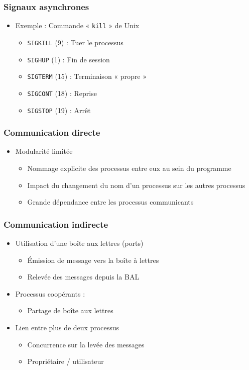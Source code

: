\begin{frame}
\frametitle{Signaux asynchrones}
\begin{itemize}
\item Exemple : Commande « \texttt{kill} » de Unix
\begin{itemize}
\item \texttt{SIGKILL} (9) : 	Tuer le processus
\item \texttt{SIGHUP} (1) : 	Fin de session
\item \texttt{SIGTERM} (15) : 	Terminaison « propre »
\item \texttt{SIGCONT} (18) : 	Reprise
\item \texttt{SIGSTOP} (19) : 	Arrêt
\end{itemize}
\end{itemize}
\end{frame}

\begin{frame}
\frametitle{Communication directe}
\begin{itemize}
\item Modularité limitée
\begin{itemize}
\item Nommage explicite des processus entre eux au sein du programme
\item Impact du changement du nom d’un processus sur les autres processus
\item Grande dépendance entre les processus communicants
\end{itemize}
\end{itemize}
\end{frame}

\begin{frame}
\frametitle{Communication indirecte}
\begin{itemize}
\item Utilisation d’une boîte aux lettres (ports)
\begin{itemize}
\item Émission de message vers la boîte à lettres
\item Relevée des messages depuis la BAL
\end{itemize}
\item Processus coopérants :
\begin{itemize}
\item Partage de boîte aux lettres
\end{itemize}
\item Lien entre plus de deux processus
\begin{itemize}
\item Concurrence sur la levée des messages
\item Propriétaire / utilisateur
\end{itemize}
\end{itemize}
\end{frame}


